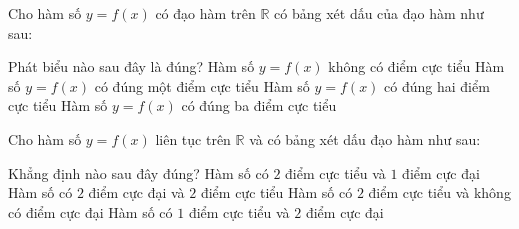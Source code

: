 \begin{ex}%
	Cho hàm số $y=f(x)$ có  đạo hàm trên $\mathbb{R}$ có bảng xét dấu của đạo hàm như sau:
	\begin{center}
	\end{center}
	Phát biểu nào sau  đây là đúng?
	 \choice
		{Hàm  số $y=f(x)$ không có điểm cực tiểu}
		{Hàm số $y=f(x)$ có đúng một điểm cực tiểu} 
		{\True Hàm số $y=f(x)$ có đúng hai  điểm cực tiểu}
		{Hàm số $y=f(x)$ có  đúng ba điểm cực tiểu}
\end{ex}

\begin{ex}%
	Cho hàm số $y=f(x)$ liên tục trên $\mathbb{R}$ và có bảng xét  dấu đạo hàm như sau:
	\begin{center}
	\end{center}
	Khẳng định nào sau đây đúng? 
	 \choice
		{\True Hàm số có $2$ điểm  cực tiểu và $1$ điểm cực đại}
		 {Hàm số có $2$ điểm cực đại và $2$ điểm cực tiểu}
		{Hàm số có $2$ điểm cực tiểu và  không có điểm cực đại}
		{Hàm số có $1$ điểm  cực tiểu và $2$ điểm cực đại}
\end{ex}


